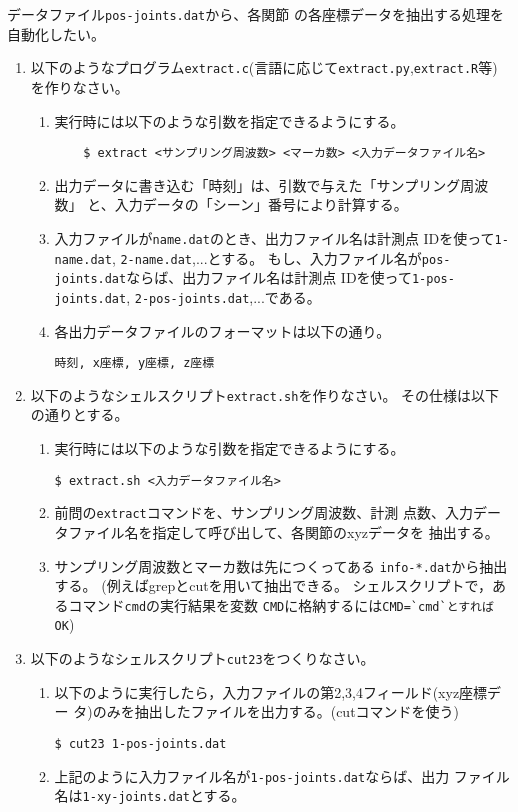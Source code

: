 \documentclass{jsarticle}
\begin{document}
データファイル\verb|pos-joints.dat|から、各関節
の各座標データを抽出する処理を自動化したい。
\begin{enumerate}
\item 以下のようなプログラム\verb|extract.c|(言語に応じて\verb|extract.py|,\verb|extract.R|等)を作りなさい。
  \begin{enumerate}
  \item 実行時には以下のような引数を指定できるようにする。
\begin{verbatim}
    $ extract <サンプリング周波数> <マーカ数> <入力データファイル名>
\end{verbatim}
  \item 出力データに書き込む「時刻」は、引数で与えた「サンプリング周波数」
    と、入力データの「シーン」番号により計算する。
  \item 入力ファイルが\verb|name.dat|のとき、出力ファイル名は計測点
    IDを使って\verb|1-name.dat|, \verb|2-name.dat|,...とする。
    もし、入力ファイル名が\verb|pos-joints.dat|ならば、出力ファイル名は計測点
    IDを使って\verb|1-pos-joints.dat|,
    \verb|2-pos-joints.dat|,...である。
  \item 各出力データファイルのフォーマットは以下の通り。
\begin{verbatim}
時刻, x座標, y座標, z座標
\end{verbatim}
  \end{enumerate}
\item  以下のようなシェルスクリプト\verb|extract.sh|を作りなさい。
  その仕様は以下の通りとする。
  \begin{enumerate}
  \item 実行時には以下のような引数を指定できるようにする。
\begin{verbatim}
$ extract.sh <入力データファイル名>
\end{verbatim}
  \item 前問の\verb|extract|コマンドを、サンプリング周波数、計測
    点数、入力データファイル名を指定して呼び出して、各関節のxyzデータを
    抽出する。
  \item サンプリング周波数とマーカ数は先につくってある
    \verb|info-*.dat|から抽出する。
    (例えばgrepとcutを用いて抽出できる。
    シェルスクリプトで，あるコマンド\verb|cmd|の実行結果を変数
    \verb|CMD|に格納するには\verb|CMD=`cmd`とすればOK|)

  \end{enumerate}
\item 以下のようなシェルスクリプト\verb|cut23|をつくりなさい。
\begin{enumerate}
\item 以下のように実行したら，入力ファイルの第2,3,4フィールド(xyz座標デー
  タ)のみを抽出したファイルを出力する。(cutコマンドを使う)
\begin{verbatim}
$ cut23 1-pos-joints.dat
\end{verbatim}
\item 上記のように入力ファイル名が\verb|1-pos-joints.dat|ならば、出力
  ファイル名は\verb|1-xy-joints.dat|とする。
\end{enumerate}
\end{enumerate}
\end{document}
